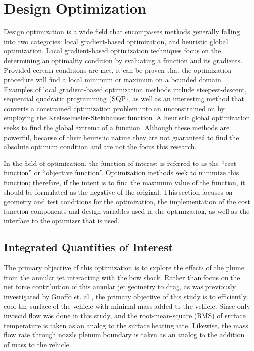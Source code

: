 \chapter{Design Optimization}
\label{chapter-six}

Design optimization is a wide field that encompasses methods generally falling
into two categories: local gradient-based optimization, and heuristic global
optimization.  Local gradient-based optimization techniques focus on the
determining an optimality condition by evaluating a function and its gradients.
Provided certain conditions are met, it can be proven that the optimization
procedure will find a local minimum or maximum on a bounded domain.  Examples of
local gradient-based optimization methods include
steepest-descent\cite{fletcher1963rapidly}, sequential quadratic programming
(SQP)\cite{SNOPT-alg}, as well as an interesting method that converts a
constrained optimization problem into an unconstrained on by employing the
Kreisselmeier-Steinhauser function\cite{wrenn1989indirect}.  A heuristic global
optimization seeks to find the global extrema of a function.  Although these
methods are powerful, because of their heuristic nature they are not guaranteed
to find the absolute optimum condition and are not the focus this research.

In the field of optimization, the function of interest is referred to as the
``cost function'' or ``objective function''.  Optimization methods seek to
minimize this function; therefore, if the intent is to find the maximum value
of the function, it should be formulated as the negative of the original.  This
section focuses on geometry and test conditions for the optimization, the
implementation of the cost function components and design variables used in the
optimization, as well as the interface to the optimizer that is used.

\section{Integrated Quantities of Interest}

The primary objective of this optimization is to explore the effects of the plume
from the annular jet interacting with the bow shock.  Rather than focus on the
net force contribution of this annular jet geometry to drag, as was previously
investigated by Gnoffo et. al \cite{gnoffo2016tapping}, the primary objective of
this study is to efficiently cool the surface of the vehicle with minimal mass
added to the vehicle.  Since only inviscid flow was done in this study, and the
root-mean-square (RMS) of surface temperature is taken as an analog to the
surface heating rate.  Likewise, the mass flow rate through nozzle plenum
boundary is taken as an analog to the addition of mass to the vehicle.

